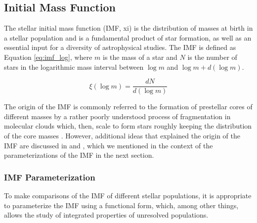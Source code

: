 \documentclass[12pt]{article}
\begin{document}

\subsection[Initial Mass Function]{Initial Mass Function}
The stellar initial mass function (\ac{IMF}, \ac{xi}) is the distribution of masses at birth in a stellar population and is a fundamental product of star formation, as well as an essential input for a diversity of astrophysical studies. The IMF is defined as Equation \ref{eq:imf_log}, where $m$ is the mass of a star and $N$ is the number of stars in the logarithmic mass interval between $\log m$ and $\log m + d(\log m)$. %

\begin{equation}
	\xi(\log m)=\frac{dN}{d(\log m)}
	\label{eq:imf_log}
\end{equation}

The origin of the IMF is commonly referred to the formation of prestellar cores of different masses by a rather poorly understood process of fragmentation in molecular clouds which, then, scale to form stars roughly keeping the distribution of the core masses \citep[e.g. ][]{Padoan-Nordlund2002,Alves2007,Hennebelle-Chabrier2013}. However, additional ideas that explained the origin of the IMF are discussed in \citet{Hennebelle-Chabrier2011} and \citet{Offner2014}, which we mentioned in the context of the parameterizations of the IMF in the next section.

\subsubsection{IMF Parameterization}
To make comparisons of the IMF of different stellar populations, it is appropriate to parameterize the IMF using a functional form, which, among other things, allows the study of integrated properties of unresolved populations.
\end{document}
